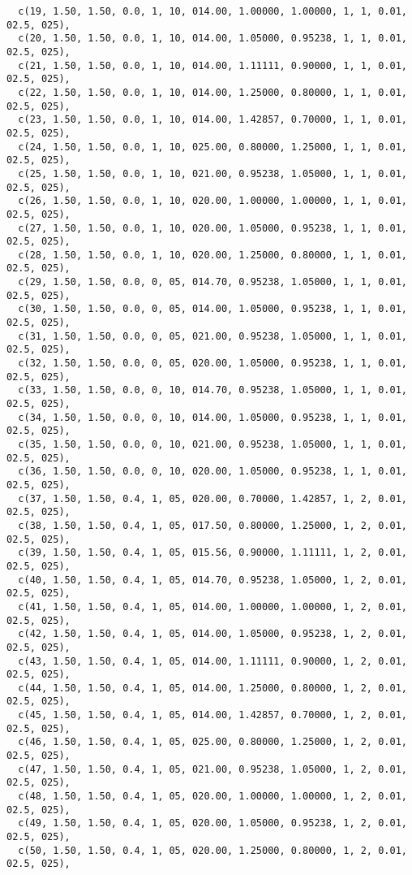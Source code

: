 \documentclass[12pt, a4paper, oneside]{article}
\theoremstyle{Plain}
\theoremstyle{Definition}
\theoremstyle{Remark}
\begin{document}
\begin{appendix}
\begin{lstlisting}
  c(19, 1.50, 1.50, 0.0, 1, 10, 014.00, 1.00000, 1.00000, 1, 1, 0.01, 02.5, 025),
  c(20, 1.50, 1.50, 0.0, 1, 10, 014.00, 1.05000, 0.95238, 1, 1, 0.01, 02.5, 025),
  c(21, 1.50, 1.50, 0.0, 1, 10, 014.00, 1.11111, 0.90000, 1, 1, 0.01, 02.5, 025),
  c(22, 1.50, 1.50, 0.0, 1, 10, 014.00, 1.25000, 0.80000, 1, 1, 0.01, 02.5, 025),
  c(23, 1.50, 1.50, 0.0, 1, 10, 014.00, 1.42857, 0.70000, 1, 1, 0.01, 02.5, 025),
  c(24, 1.50, 1.50, 0.0, 1, 10, 025.00, 0.80000, 1.25000, 1, 1, 0.01, 02.5, 025),
  c(25, 1.50, 1.50, 0.0, 1, 10, 021.00, 0.95238, 1.05000, 1, 1, 0.01, 02.5, 025),
  c(26, 1.50, 1.50, 0.0, 1, 10, 020.00, 1.00000, 1.00000, 1, 1, 0.01, 02.5, 025),
  c(27, 1.50, 1.50, 0.0, 1, 10, 020.00, 1.05000, 0.95238, 1, 1, 0.01, 02.5, 025),
  c(28, 1.50, 1.50, 0.0, 1, 10, 020.00, 1.25000, 0.80000, 1, 1, 0.01, 02.5, 025),
  c(29, 1.50, 1.50, 0.0, 0, 05, 014.70, 0.95238, 1.05000, 1, 1, 0.01, 02.5, 025),
  c(30, 1.50, 1.50, 0.0, 0, 05, 014.00, 1.05000, 0.95238, 1, 1, 0.01, 02.5, 025),
  c(31, 1.50, 1.50, 0.0, 0, 05, 021.00, 0.95238, 1.05000, 1, 1, 0.01, 02.5, 025),
  c(32, 1.50, 1.50, 0.0, 0, 05, 020.00, 1.05000, 0.95238, 1, 1, 0.01, 02.5, 025),
  c(33, 1.50, 1.50, 0.0, 0, 10, 014.70, 0.95238, 1.05000, 1, 1, 0.01, 02.5, 025),
  c(34, 1.50, 1.50, 0.0, 0, 10, 014.00, 1.05000, 0.95238, 1, 1, 0.01, 02.5, 025),
  c(35, 1.50, 1.50, 0.0, 0, 10, 021.00, 0.95238, 1.05000, 1, 1, 0.01, 02.5, 025),
  c(36, 1.50, 1.50, 0.0, 0, 10, 020.00, 1.05000, 0.95238, 1, 1, 0.01, 02.5, 025),
  c(37, 1.50, 1.50, 0.4, 1, 05, 020.00, 0.70000, 1.42857, 1, 2, 0.01, 02.5, 025),
  c(38, 1.50, 1.50, 0.4, 1, 05, 017.50, 0.80000, 1.25000, 1, 2, 0.01, 02.5, 025),
  c(39, 1.50, 1.50, 0.4, 1, 05, 015.56, 0.90000, 1.11111, 1, 2, 0.01, 02.5, 025),
  c(40, 1.50, 1.50, 0.4, 1, 05, 014.70, 0.95238, 1.05000, 1, 2, 0.01, 02.5, 025),
  c(41, 1.50, 1.50, 0.4, 1, 05, 014.00, 1.00000, 1.00000, 1, 2, 0.01, 02.5, 025),
  c(42, 1.50, 1.50, 0.4, 1, 05, 014.00, 1.05000, 0.95238, 1, 2, 0.01, 02.5, 025),
  c(43, 1.50, 1.50, 0.4, 1, 05, 014.00, 1.11111, 0.90000, 1, 2, 0.01, 02.5, 025),
  c(44, 1.50, 1.50, 0.4, 1, 05, 014.00, 1.25000, 0.80000, 1, 2, 0.01, 02.5, 025),
  c(45, 1.50, 1.50, 0.4, 1, 05, 014.00, 1.42857, 0.70000, 1, 2, 0.01, 02.5, 025),
  c(46, 1.50, 1.50, 0.4, 1, 05, 025.00, 0.80000, 1.25000, 1, 2, 0.01, 02.5, 025),
  c(47, 1.50, 1.50, 0.4, 1, 05, 021.00, 0.95238, 1.05000, 1, 2, 0.01, 02.5, 025),
  c(48, 1.50, 1.50, 0.4, 1, 05, 020.00, 1.00000, 1.00000, 1, 2, 0.01, 02.5, 025),
  c(49, 1.50, 1.50, 0.4, 1, 05, 020.00, 1.05000, 0.95238, 1, 2, 0.01, 02.5, 025),
  c(50, 1.50, 1.50, 0.4, 1, 05, 020.00, 1.25000, 0.80000, 1, 2, 0.01, 02.5, 025),

\end{lstlisting}
\end{appendix}
\end{document}
